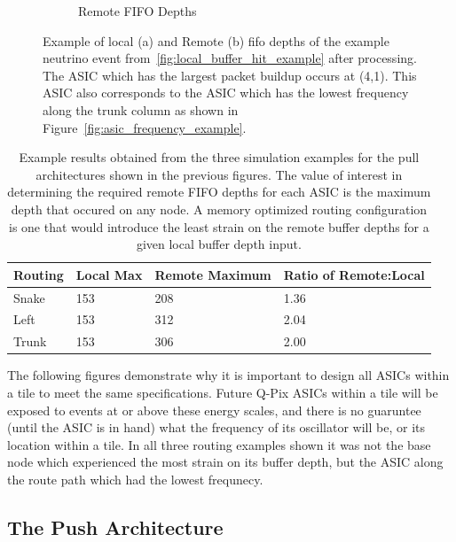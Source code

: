 \begin{figure}
\begin{subfigure}{.5\textwidth}
  \caption{Remote FIFO Depths}
\end{subfigure}
\caption{Example of local (a) and Remote (b) fifo depths of the example neutrino event from~\ref{fig:local_buffer_hit_example} after processing.
The ASIC which has the largest packet buildup occurs at (4,1).
This ASIC also corresponds to the ASIC which has the lowest frequency along the trunk column as shown in Figure~\ref{fig:asic_frequency_example}.
}
\label{fig:trunk_example_neutrino}
\end{figure}


\begin{table}
\begin{center}
\begin{tabular}{|| p{20mm} | p{40mm} | p{40mm} | p{45mm} ||}
 \hline
 Routing & Local Max & Remote Maximum & Ratio of Remote:Local \\ [0.5ex]
 \hline\hline
  Snake & 153 & 208 & 1.36 \\
 \hline
  Left & 153 & 312 & 2.04 \\
 \hline
  Trunk & 153 & 306 & 2.00 \\
 \hline
 \hline
\end{tabular}
\caption{Example results obtained from the three simulation examples for the pull architectures shown in the previous figures.
The value of interest in determining the required remote FIFO depths for each ASIC is the maximum depth that occured on any node.
A memory optimized routing configuration is one that would introduce the least strain on the remote buffer depths for a given local buffer depth input.
}
\label{table:example_analysis}
\end{center}
\end{table}

The following figures demonstrate why it is important to design all ASICs within a tile to meet the same specifications.
Future Q-Pix ASICs within a tile will be exposed to events at or above these energy scales, and there is no guaruntee (until the ASIC is in hand) what the frequency of its oscillator will be, or its location within a tile. 
In all three routing examples shown it was not the base node which experienced the most strain on its buffer depth, but the ASIC along the route path which had the lowest frequnecy.


\subsection{The Push Architecture}

